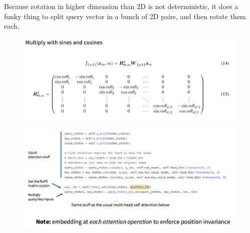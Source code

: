 \documentclass{article}
\begin{document}
Because rotation in higher dimension than 2D is not deterministic, it does a funky thing to split query vector in a bunch of 2D pairs, and then rotate them each.


\begin{figure}[!h]
	\centering
	\includegraphics[scale=0.4]{imgs/rope.png}
\end{figure}


\begin{figure}[!h]
	\centering
	\includegraphics[scale=0.4]{imgs/rope-code.png}
\end{figure}

\clearpage
 

\newpage
\appendix
\end{document}
